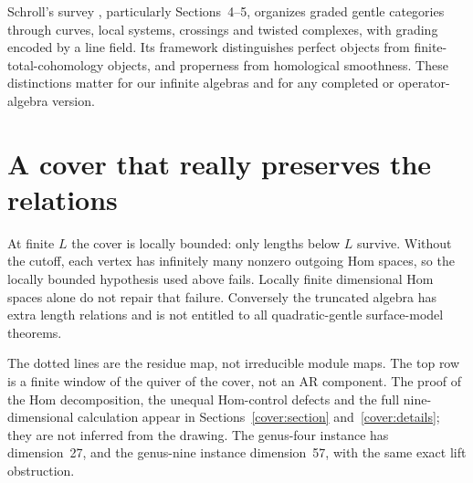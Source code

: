 \documentclass[11pt,oneside,openany]{book}
\theoremstyle{definition}\newtheorem{definition}[theorem]{Definition}
\theoremstyle{remark}\newtheorem{remark}[theorem]{Remark}
\begin{document}
Schroll's survey \cite{SchrollGeometric2026}, particularly Sections~4--5,
organizes graded gentle categories through curves, local systems, crossings
and twisted complexes, with grading encoded by a line field. Its framework
distinguishes perfect objects from finite-total-cohomology objects, and
properness from homological smoothness. These distinctions matter for our
infinite algebras and for any completed or operator-algebra version.

\section{A cover that really preserves the relations}
At finite $L$ the cover is locally bounded: only lengths below $L$ survive.
Without the cutoff, each vertex has infinitely many nonzero outgoing Hom
spaces, so the locally bounded hypothesis used above fails. Locally finite
dimensional Hom spaces alone do not repair that failure. Conversely the
truncated algebra has extra length relations and is not entitled to all
quadratic-gentle surface-model theorems.

\begin{center}
\par{}
\end{center}
The dotted lines are the residue map, not irreducible module maps. The top
row is a finite window of the quiver of the cover, not an AR component.
The proof of the Hom decomposition, the unequal Hom-control defects and the
full nine-dimensional calculation appear in
Sections~\ref{cover:section} and~\ref{cover:details}; they are not inferred
from the drawing. The genus-four instance has dimension~27, and the
genus-nine instance dimension~57, with the same exact lift obstruction.
\end{document}
